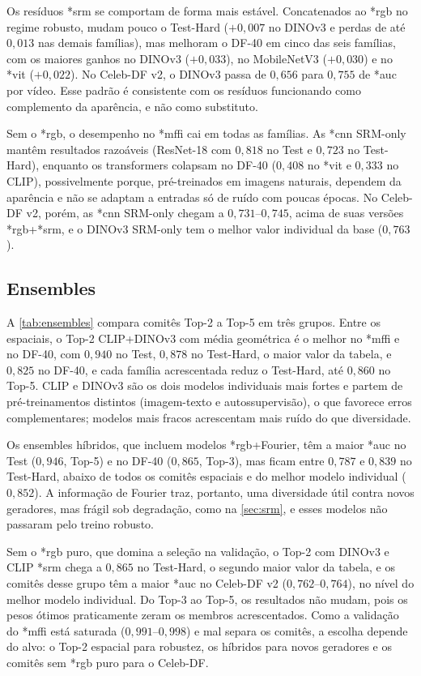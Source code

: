 \documentclass[10pt,conference]{IEEEtran}
\makeatletter
\newcommand{\acr@use}[2]{%
  \@ifundefined{acr@short@#1}{\textbf{??#1??}}{%
    \@ifundefined{acr@used@#1}{%
      \ifnum#2=0 \csname acr@long@#1\endcsname\else\csname acr@longpl@#1\endcsname\fi
      ~(\csname acr@short@#1\endcsname\ifnum#2=1 s\fi)%
      \expandafter\gdef\csname acr@used@#1\endcsname{}%
    }{%
      \csname acr@short@#1\endcsname\ifnum#2=1 s\fi
    }}%
}
\DeclareRobustCommand{\gls}{\@ifstar{\acr@use@s}{\acr@use@s}}
\newcommand{\acr@use@s}[1]{\acr@use{#1}{0}}
\DeclareRobustCommand{\glspl}{\@ifstar{\acr@use@p}{\acr@use@p}}
\newcommand{\acr@use@p}[1]{\acr@use{#1}{1}}
\makeatother
\begin{document}
Os resíduos \gls*{srm} se comportam de forma mais estável.
Concatenados ao \gls*{rgb} no regime robusto, mudam pouco o Test-Hard ($+0{,}007$ no DINOv3 e perdas de até $0{,}013$ nas demais famílias), mas melhoram o DF-40 em cinco das seis famílias, com os maiores ganhos no DINOv3 ($+0{,}033$), no MobileNetV3 ($+0{,}030$) e no \gls*{vit} ($+0{,}022$).
No Celeb-DF v2, o DINOv3 passa de $0{,}656$ para $0{,}755$ de \gls*{auc} por vídeo.
Esse padrão é consistente com os resíduos funcionando como complemento da aparência, e não como substituto.

Sem o \gls*{rgb}, o desempenho no \gls*{mffi} cai em todas as famílias.
As \glspl*{cnn} SRM-only mantêm resultados razoáveis (ResNet-18 com $0{,}818$ no Test e $0{,}723$ no Test-Hard), enquanto os transformers colapsam no DF-40 ($0{,}408$ no \gls*{vit} e $0{,}333$ no CLIP), possivelmente porque, pré-treinados em imagens naturais, dependem da aparência e não se adaptam a entradas só de ruído com poucas épocas.
No Celeb-DF v2, porém, as \glspl*{cnn} SRM-only chegam a $0{,}731$--$0{,}745$, acima de suas versões \gls*{rgb}+\gls*{srm}, e o DINOv3 SRM-only tem o melhor valor individual da base ($0{,}763$).

\subsection{Ensembles}
\label{sec:ensembles}

A \cref{tab:ensembles} compara comitês Top-2 a Top-5 em três grupos.
Entre os espaciais, o Top-2 CLIP+DINOv3 com média geométrica é o melhor no \gls*{mffi} e no DF-40, com $0{,}940$ no Test, $0{,}878$ no Test-Hard, o maior valor da tabela, e $0{,}825$ no DF-40, e cada família acrescentada reduz o Test-Hard, até $0{,}860$ no Top-5.
CLIP e DINOv3 são os dois modelos individuais mais fortes e partem de pré-treinamentos distintos (imagem-texto e autossupervisão), o que favorece erros complementares; modelos mais fracos acrescentam mais ruído do que diversidade.

Os ensembles híbridos, que incluem modelos \gls*{rgb}+Fourier, têm a maior \gls*{auc} no Test ($0{,}946$, Top-5) e no DF-40 ($0{,}865$, Top-3), mas ficam entre $0{,}787$ e $0{,}839$ no Test-Hard, abaixo de todos os comitês espaciais e do melhor modelo individual ($0{,}852$).
A informação de Fourier traz, portanto, uma diversidade útil contra novos geradores, mas frágil sob degradação, como na \cref{sec:srm}, e esses modelos não passaram pelo treino robusto.

Sem o \gls*{rgb} puro, que domina a seleção na validação, o Top-2 com DINOv3 e CLIP \gls*{srm} chega a $0{,}865$ no Test-Hard, o segundo maior valor da tabela, e os comitês desse grupo têm a maior \gls*{auc} no Celeb-DF v2 ($0{,}762$--$0{,}764$), no nível do melhor modelo individual.
Do Top-3 ao Top-5, os resultados não mudam, pois os pesos ótimos praticamente zeram os membros acrescentados.
Como a validação do \gls*{mffi} está saturada ($0{,}991$--$0{,}998$) e mal separa os comitês, a escolha depende do alvo: o Top-2 espacial para robustez, os híbridos para novos geradores e os comitês sem \gls*{rgb} puro para o Celeb-DF.
\end{document}
